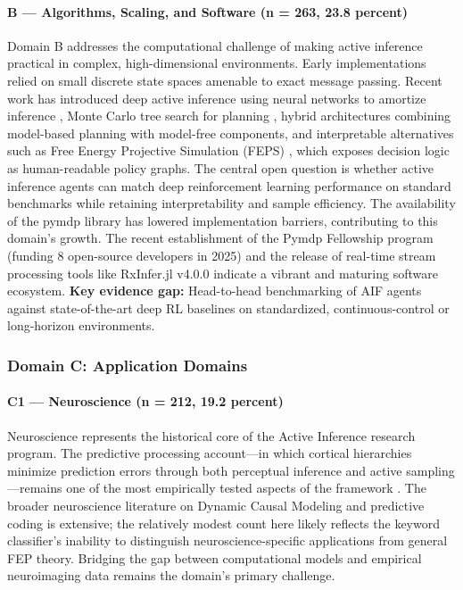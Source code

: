\documentclass[
  english,
]{article}
\begin{document}
\paragraph{B --- Algorithms, Scaling, and Software (n = 263, 23.8
percent)}\label{b-algorithms-scaling-and-software-n-263-23.8-percent}

Domain B addresses the computational challenge of making active
inference practical in complex, high-dimensional environments. Early
implementations relied on small discrete state spaces amenable to exact
message passing. Recent work has introduced deep active inference using
neural networks to amortize inference \citep{fountas2020deep}, Monte
Carlo tree search for planning \citep{champion2021realizing}, hybrid
architectures combining model-based planning with model-free components,
and interpretable alternatives such as Free Energy Projective Simulation
(FEPS) \citep{pazem2024feps}, which exposes decision logic as
human-readable policy graphs. The central open question is whether
active inference agents can match deep reinforcement learning
performance on standard benchmarks while retaining interpretability and
sample efficiency. The availability of the pymdp library
\citep{heins2022pymdp} has lowered implementation barriers, contributing
to this domain's growth. The recent establishment of the Pymdp
Fellowship program (funding 8 open-source developers in 2025) and the
release of real-time stream processing tools like RxInfer.jl v4.0.0
\citep{rxinfer2025} indicate a vibrant and maturing software ecosystem.
\textbf{Key evidence gap:} Head-to-head benchmarking of AIF agents
against state-of-the-art deep RL baselines on standardized,
continuous-control or long-horizon environments.

\subsubsection{Domain C: Application
Domains}\label{domain-c-application-domains}

\paragraph{C1 --- Neuroscience (n = 212, 19.2
percent)}\label{c1-neuroscience-n-212-19.2-percent}

Neuroscience represents the historical core of the Active Inference
research program. The predictive processing account---in which cortical
hierarchies minimize prediction errors through both perceptual inference
and active sampling---remains one of the most empirically tested aspects
of the framework \citep{friston2010free, clark2013whatever}. The broader
neuroscience literature on Dynamic Causal Modeling and predictive coding
is extensive; the relatively modest count here likely reflects the
keyword classifier's inability to distinguish neuroscience-specific
applications from general FEP theory. Bridging the gap between
computational models and empirical neuroimaging data remains the
domain's primary challenge.
\end{document}
